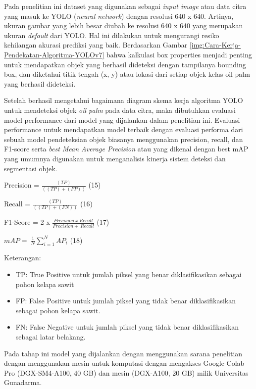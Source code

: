 Pada penelitian ini dataset yang digunakan sebagai \textit{input image} atau data citra yang masuk ke YOLO (\textit{neural network}) dengan resolusi 640 x 640. Artinya, ukuran gambar yang lebih besar diubah ke resolusi 640 x 640 yang merupakan ukuran \textit{default} dari YOLO. Hal ini dilakukan untuk mengurangi resiko kehilangan akurasi prediksi yang baik. Berdasarkan Gambar \ref{img:Cara-Kerja-Pendekatan-Algoritma-YOLOv7} bahwa kalkulasi box properties menjadi penting untuk mendapatkan objek yang berhasil dideteksi dengan tampilanya bounding box, dan diketahui titik tengah (x, y) atau lokasi dari setiap objek kelas oil palm yang berhasil dideteksi.

Setelah berhasil mengetahui bagaimana diagram skema kerja algoritma YOLO untuk mendeteksi objek \textit{oil palm} pada data citra, maka dibutuhkan evaluasi model performance dari model yang dijalankan dalam penelitian ini. Evaluasi performance untuk mendapatkan model terbaik dengan evaluasi performa dari sebuah model pendeteksian objek biasanya menggunakan precision, recall, dan F1-score serta \textit{best Mean Average Precision} atau yang dikenal dengan best mAP yang umumnya digunakan untuk menganalisis kinerja sistem deteksi dan segmentasi objek.

Precision = $\frac{(TP)}{(\left(TP\right)+\left(FP\right))}$ \hfill (15)

Recall = $\frac{(TP)}{(\left(TP\right)+\left(FN\right))}$ \hfill (16)

F1-Score = 2 x $\frac{Precision\ x\ Recall}{Precision+\ Recall}$ \hfill (17)

$mAP=\ \frac{1}{N}\sum_{i=1}^{N}{AP}_{i}$ \hfill (18)
	
Keterangan:
\begin{itemize}
	\item TP: True Positive untuk jumlah piksel yang benar diklasifikasikan sebagai pohon kelapa sawit
	
	\item FP: False Positive untuk jumlah piksel yang tidak benar diklasifikasikan sebagai pohon kelapa sawit. 
	
	\item FN: False Negative untuk jumlah piksel yang tidak benar diklasifikasikan sebagai latar belakang. 
	
\end{itemize}

Pada tahap ini model yang dijalankan dengan menggunakan sarana penelitian dengan menggunakan mesin untuk komputasi dengan mengakses Google Colab Pro (DGX-SM4-A100, 40 GB) dan mesin (DGX-A100, 20 GB) milik Universitas Gunadarma.

